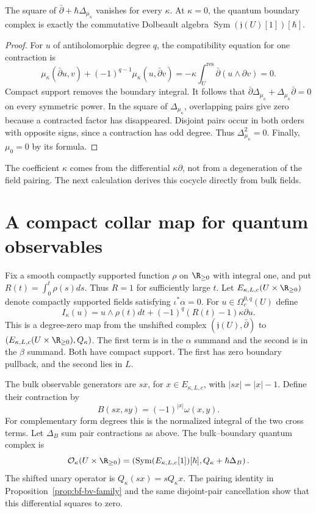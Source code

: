 \begin{lemma}
\label{lem:bf-boundary-differential}
The square of $\bar\partial+\hbar\Delta_{\mu_\kappa}$ vanishes
for every $\kappa$.  At $\kappa=0$, the quantum boundary complex is
exactly the commutative Dolbeault algebra
$\operatorname{Sym}(\mathfrak j(U)[1])[\hbar]$.
\end{lemma}
\begin{proof}
For $u$ of antiholomorphic degree $q$, the compatibility equation for
one contraction is
\[
 \mu_\kappa(\bar\partial u,v)
 +(-1)^{q-1}\mu_\kappa(u,\bar\partial v)
 =-\kappa\int_U^{\mathrm{res}}\bar\partial(u\wedge\partial v)=0.
\]
Compact support removes the boundary integral.  It follows that
$\bar\partial\Delta_{\mu_\kappa}+
\Delta_{\mu_\kappa}\bar\partial=0$ on every symmetric power.
In the square of $\Delta_{\mu_\kappa}$, overlapping pairs give zero
because a contracted factor has disappeared.  Disjoint pairs occur
in both orders with opposite signs, since a contraction has odd
degree.  Thus $\Delta_{\mu_\kappa}^2=0$.
Finally, $\mu_0=0$ by its formula.
\end{proof}

The coefficient $\kappa$ comes from the differential
$\kappa\partial$, not from a degeneration of the field pairing.
The next calculation derives this cocycle directly from bulk fields.

\section{A compact collar map for quantum observables}

Fix a smooth compactly supported function $\rho$ on $\R_{\ge0}$
with integral one, and put
$R(t)=\int_0^t\rho(s)ds$.  Thus $R=1$ for sufficiently large $t$.
Let $E_{\kappa,L,c}(U\times\R_{\ge0})$ denote compactly supported
fields satisfying $\iota^*\alpha=0$.
For $u\in\Omega_c^{0,q}(U)$ define
\[
 I_\kappa(u)=u\wedge\rho(t)dt
                +(-1)^q(R(t)-1)\kappa\partial u.
\]
This is a degree-zero map from the unshifted complex
$(\mathfrak j(U),\bar\partial)$ to
$(E_{\kappa,L,c}(U\times\R_{\ge0}),Q_\kappa)$.
The first term is in the $\alpha$ summand and the second is in the
$\beta$ summand.  Both have compact support.  The first has zero
boundary pullback, and the second lies in $L$.

The bulk observable generators are $sx$, for $x\in E_{\kappa,L,c}$,
with $|sx|=|x|-1$.  Define their contraction by
\[
 B(sx,sy)=(-1)^{|x|}\omega(x,y).
\]
For complementary form degrees this is the normalized integral
of the two cross terms.  Let $\Delta_B$ sum pair contractions as above.
The bulk--boundary quantum complex is
\[
 \mathcal O_\kappa(U\times\R_{\ge0})
 =\left(\operatorname{Sym}(E_{\kappa,L,c}[1])[\hbar],
                         Q_\kappa+\hbar\Delta_B\right).
\]
The shifted unary operator is $Q_\kappa(sx)=sQ_\kappa x$.
The pairing identity in Proposition~\ref{prop:bf-bv-family} and the
same disjoint-pair cancellation show that this differential squares
to zero.

